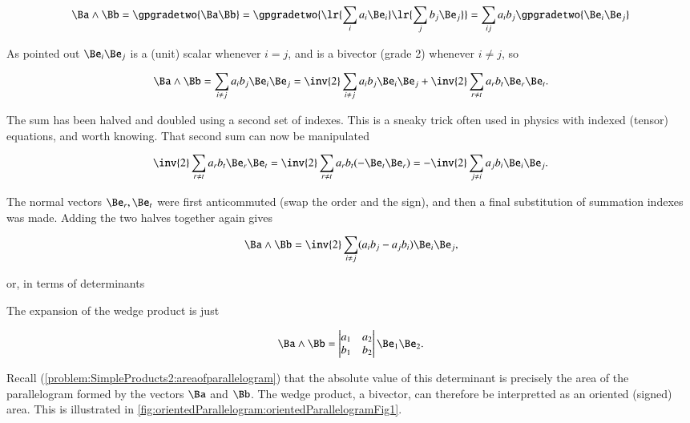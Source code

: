 \begin{dmath}\label{eqn:SimpleProducts2:1240}
\Ba \wedge \Bb
=
\gpgradetwo{ \Ba \Bb }
=
\gpgradetwo{ \lr{ \sum_i a_i \Be_i }
\lr{ \sum_j b_j \Be_j }
}
=
\sum_{ij} a_i b_j \gpgradetwo{ \Be_i \Be_j }
\end{dmath}

As pointed out \( \Be_i \Be_j \) is a (unit) scalar whenever \( i = j \), and is a bivector (grade 2) whenever \( i \ne j \), so

\begin{dmath}\label{eqn:SimpleProducts2:1260}
\Ba \wedge \Bb
=
\sum_{i \ne j} a_i b_j \Be_i \Be_j
=
\inv{2}
\sum_{i \ne j} a_i b_j
\Be_i \Be_j
+
\inv{2}
\sum_{r \ne t} a_r b_t
\Be_r \Be_t.
\end{dmath}

The sum has been halved and doubled using a second set of indexes.  This is a sneaky trick often used in physics with indexed (tensor) equations, and worth knowing.  That second sum can now be manipulated

\begin{dmath}\label{eqn:SimpleProducts2:1280}
\inv{2}
\sum_{r \ne t} a_r b_t
\Be_r \Be_t
=
\inv{2}
\sum_{r \ne t} a_r b_t
(-\Be_t \Be_r)
=
-\inv{2}
\sum_{j \ne i} a_j b_i
\Be_i \Be_j.
\end{dmath}

The normal vectors \( \Be_r, \Be_t \) were first anticommuted (swap the order and the sign), and then a final substitution of summation indexes was made.  Adding the two halves together again gives

\begin{dmath}\label{eqn:SimpleProducts2:1300}
\Ba \wedge \Bb
=
\inv{2} \sum_{i \ne j} (a_i b_j - a_j b_i) \Be_i \Be_j,
\end{dmath}

or, in terms of determinants

The  expansion of the wedge product is just

\begin{dmath}\label{eqn:SimpleProducts2:1340}
\Ba \wedge \Bb
=
\begin{vmatrix}
a_1 & a_2 \\
b_1 & b_2
\end{vmatrix}
\Be_1 \Be_2.
\end{dmath}

Recall (\cref{problem:SimpleProducts2:areaofparallelogram}) that the absolute value of this determinant is precisely the area of the parallelogram formed by the vectors \( \Ba \) and \( \Bb \).  The wedge product, a bivector, can therefore be interpretted as an oriented (signed) area.  This is illustrated in \cref{fig:orientedParallelogram:orientedParallelogramFig1}.

